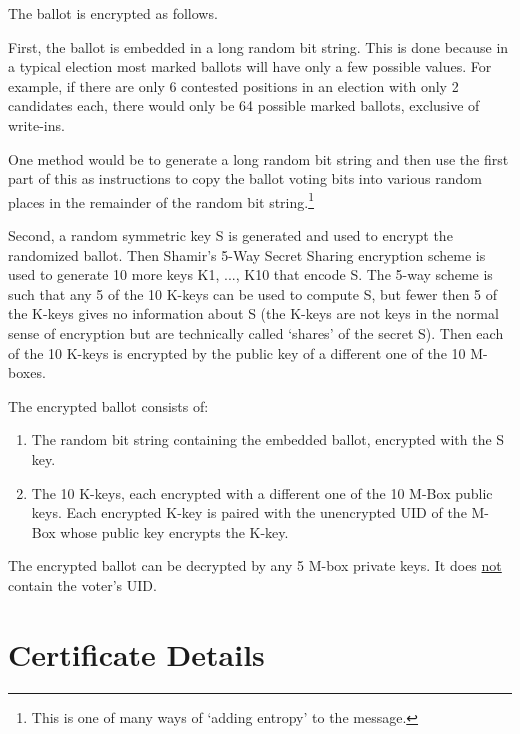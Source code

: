 \documentclass[12pt]{article}
\begin{document}
The ballot is encrypted as follows.

First, the ballot is embedded in a long random bit string.
This is done because in a typical election most marked ballots will
have only a few possible values.  For example, if there are only
6 contested positions in an election
with only 2 candidates each, there would only
be 64 possible marked ballots, exclusive of write-ins.

One method would be to generate a long random bit string and then
use the first part of this as instructions to copy the ballot voting bits into
various random places in the remainder of the random bit string.\footnote{
This is one of many ways of `adding entropy' to the message.}

Second, a random symmetric key S is generated and used to encrypt
the randomized ballot.  Then
Shamir's 5-Way Secret Sharing encryption scheme is used to generate
10 more keys K1, ..., K10 that encode S.
The 5-way scheme is such that any 5 of the 10 K-keys can be used
to compute S, but fewer then 5 of the K-keys gives no information
about S (the K-keys are not keys in the normal sense of encryption
but are technically called `shares' of the secret S).
Then each of the 10 K-keys is encrypted by the public key
of a different one of the 10 M-boxes.

The encrypted ballot consists of:
\begin{enumerate}
\item The random bit string containing the embedded ballot,
      encrypted with the S key.
\item The 10 K-keys, each encrypted with a
      different one of the 10 M-Box public keys.
      Each encrypted K-key is paired with the unencrypted
      UID of the M-Box whose public key encrypts the K-key.
\end{enumerate}
The encrypted ballot can be decrypted
by any 5 M-box private keys.
It does \underline{not} contain the voter's UID.

\section{Certificate Details}
\label{CERTIFICATE-DETAILS}
\end{document}

